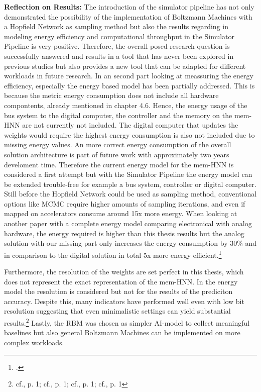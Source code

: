 \textbf{Reflection on Results:} The introduction of the simulator pipeline has not only demonstrated the possibility 
of the implementation of Boltzmann Machines with a Hopfield Network as sampling method but also the results regarding
in modeling energy efficiency and computational throughput in the Simulator Pipeline is very positive.
Therefore, the overall posed research question is successfully answered and results in a tool that has never been explored in previous studies but also
provides a new tool that can be adapted for different workloads in future research. 
In an second part looking at meassuring the energy efficiency, especially the energy based model has been partially addressed.
This is because the metric energy consumption does not include all hardware compontents, already mentioned in chapter 4.6.
Hence, the energy usage of the bus system to the digital computer, the controller and the memory on the \ac{mem-HNN} 
are not currently not included.
The digital computer that updates the weights would require the highest energy consumption is also not included due to missing energy values.
An more correct energy consumption of the overall solution architecture is part of future work with approximately two years develoment time.
Therefore the current energy model for the \ac{mem-HNN} is considered a first attempt but with the Simulator Pipeline
the energy model can be extended trouble-free for example a bus system, controller or digital computer.
Still before the Hopfield Network could be used as sampling method, conventional options like \ac{MCMC} 
require higher amounts of sampling iterations, and even if mapped on accelerators consume around 15x more energy.
When looking at another paper with a complete energy model comparing electronical with analog hardware, the energy required is 
higher than this thesis results but the analog solution with our missing part only increases the energy consumption by 30\% and in comparison to
the digital solution in total 5x more energy efficient.\footcite[cf.][12-13]{demirkiranElectroPhotonicSystemAccelerating2023}

Furthermore, the resolution of the weights are set perfect in this thesis, which does not represent the
exact representation of the \ac{mem-HNN}. In the energy model the resolution is considered but
not for the results of the prediciton accuracy. 
Despite this, many indicators have performed well even with low bit resolution suggesting that even minimalistic settings can yield substantial results.\footnote{cf.\cite{maEra1bitLLMs2024}, p. 1; cf.\cite{GitHubHtqinQuantSR}, p. 1; cf.\cite{rouhaniMicroscalingDataFormats2023}, p. 1; cf.\cite{rouhaniSharedMicroexponentsLittle2023}, p. 1}
Lastly, the \ac{RBM} was chosen as simpler AI-model to collect meaningful baselines but also general Boltzmann Machines can be implemented on more complex workloads. 


